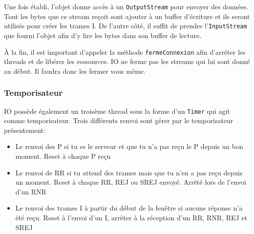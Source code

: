 \documentclass{article}
\begin{document}
    Une fois établi, l'objet donne accès à un \verb#OutputStream# pour envoyer des données. Tout les bytes que ce stream reçoit sont ajouter à un buffer d'écriture et ils seront utilisés pour créer les trames I.
    De l'autre côté, il suffit de prendre l'\verb#InputStream# que fourni l'objet afin d'y lire les bytes dans son buffer de lecture.
    
    À la fin, il est important d'appeler la méthode \verb#fermeConnexion# afin d'arrêter les threads et de libérer les ressources. IO ne ferme pas les streams qui lui sont donné au début. Il faudra donc les fermer vous même.

    \subsubsection{Temporisateur}
    IO possède également un troisème thread sous la forme d'un \verb#Timer# qui agit comme temporisateur. Trois différents renvoi sont gérer par le temporisateur présentement:
    \begin{itemize}
        \item Le renvoi des P si tu es le serveur et que tu n'a pas reçu le P depuis un bon moment. Reset à chaque P reçu
        \item Le renvoi de RR si tu attend des trames mais que tu n'en a pas reçu depuis un moment. Reset à chaque RR, REJ ou SREJ envoyé. Arrêté lors de l'envoi d'un RNR
        \item Le renvoi des trames I à partir du début de la fenêtre si aucune réponse n'a été reçu. Reset à l'envoi d'un I, arrêter à la réception d'un RR, RNR, REJ et SREJ
    \end{itemize}
\end{document}
